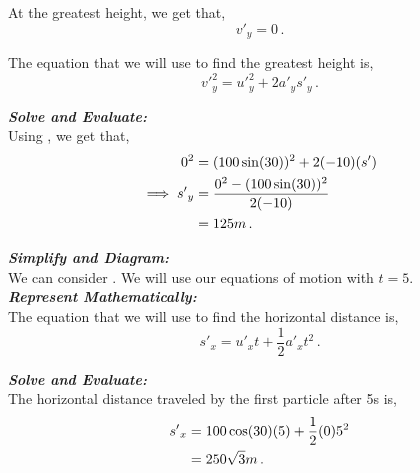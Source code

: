 \begin{subquestions}
At the greatest height, we get that,
\begin{equation}
	{v'}_y = 0 \,.
\end{equation}

The equation that we will use to find the greatest height is,
\begin{equation}
	{v'}_y^2 = {u'}_y^2 + 2{a'}_y{s'}_y \,. \label{2008J:q6:SEqn1} 
\end{equation}




\textbf{\textit{Solve and Evaluate:}} \\
Using , we get that,
\begin{align}
	0^2 & = (100\sin(30))^2 + 2(-10)({s'}) \nonumber \\
	\implies {s'}_y & = \frac{0^2-(100\sin(30))^2}{2(-10)} \nonumber \\
		& = 125m \,.
\end{align}


\subquestion

\begin{subsubquestions}
	
\subsubquestion

\textbf{\textit{Simplify and Diagram:}} \\
We can consider . We will use our equations of motion with $t=5$.\\




\textbf{\textit{Represent Mathematically:}} \\			
The equation that we will use to find the horizontal distance is,
\begin{equation}
	{s'}_x ={u'}_xt + \frac{1}{2}{a'}_xt^2 \,.	
\end{equation}




\textbf{\textit{Solve and Evaluate:}} \\
The horizontal distance traveled by the first particle after 5s is,
\begin{align}
	{s'}_x & = 100\cos(30)(5) + \frac{1}{2}(0)5^2 \nonumber \\
	    & = 250\sqrt{3}m \,.
\end{align}



\end{subsubquestions}
\end{subquestions}
